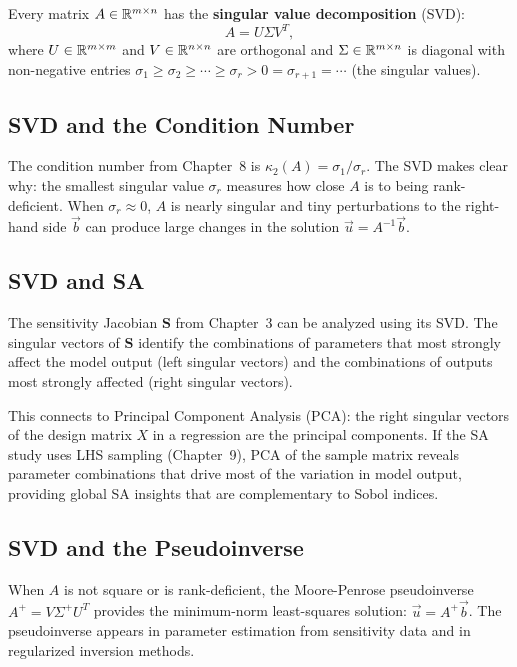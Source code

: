 Every matrix $A \in \mathbb{R}^{m\times n}$ has the \textbf{singular value
decomposition} (SVD):
\begin{equation}
  A = U\Sigma V^T,
  \label{eq:SVD}
\end{equation}
where $U \in \mathbb{R}^{m\times m}$ and $V \in \mathbb{R}^{n\times n}$ are orthogonal
and $\Sigma \in \mathbb{R}^{m\times n}$ is diagonal with non-negative entries
$\sigma_1 \geq \sigma_2 \geq \cdots \geq \sigma_r > 0 = \sigma_{r+1} = \cdots$
(the singular values).

\subsection{SVD and the Condition Number}

The condition number from Chapter~8 is
$\kappa_2(A) = \sigma_1/\sigma_r$.
The SVD makes clear why: the smallest singular value $\sigma_r$
measures how close $A$ is to being rank-deficient. When $\sigma_r \approx 0$,
$A$ is nearly singular and tiny perturbations to the right-hand side
$\vec{b}$ can produce large changes in the solution $\vec{u} = A^{-1}\vec{b}$.

\subsection{SVD and SA}

The sensitivity Jacobian $\mathbf{S}$ from Chapter~3 can be analyzed
using its SVD. The singular vectors of $\mathbf{S}$ identify the
combinations of parameters that most strongly affect the model output
(left singular vectors) and the combinations of outputs most strongly
affected (right singular vectors).

This connects to Principal Component Analysis (PCA):
the right singular vectors of the design matrix $X$ in a regression
are the principal components. If the SA study uses LHS sampling
(Chapter~9), PCA of the sample matrix reveals parameter combinations
that drive most of the variation in model output, providing global
SA insights that are complementary to Sobol indices.

\subsection{SVD and the Pseudoinverse}

When $A$ is not square or is rank-deficient, the Moore-Penrose
pseudoinverse $A^+ = V\Sigma^+ U^T$ provides the minimum-norm
least-squares solution: $\vec{u} = A^+\vec{b}$.
The pseudoinverse appears in parameter estimation from
sensitivity data and in regularized inversion methods.

